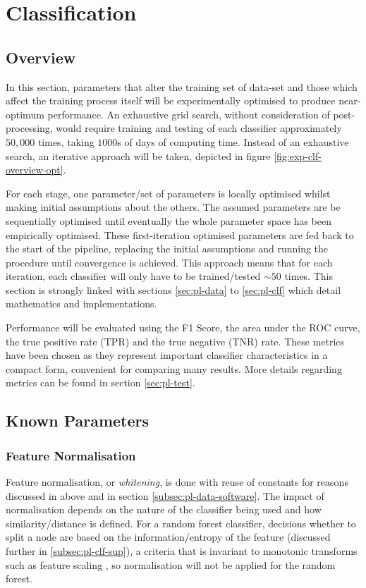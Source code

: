 \section{Classification}
\label{sec:exp-clf}
    \subsection{Overview}
    \label{subsec:exp-clf-overview}
        In this section, parameters that alter the training set of data-set and those which affect the training process itself will be experimentally optimised to produce near-optimum performance. An exhaustive grid search, without consideration of post-processing, would require training and testing of each classifier approximately $50,000$ times, taking $1000$s of days of computing time. Instead of an exhaustive search, an iterative approach will be taken, depicted in figure \ref{fig:exp-clf-overview-opt}. 
        
        
        For each stage, one parameter/set of parameters is locally optimised whilst making initial assumptions about the others. The assumed parameters are be sequentially optimised until eventually the whole parameter space has been empirically optimised. These first-iteration optimised parameters are fed back to the start of the pipeline, replacing the initial assumptions and running the procedure until convergence is achieved. This approach means that for each iteration, each classifier will only have to be trained/tested $\sim50$ times. This section is strongly linked with sections \ref{sec:pl-data} to \ref{sec:pl-clf} which detail mathematics and implementations.
        
        Performance will be evaluated using the F1 Score, the area under the ROC curve, the true positive rate (TPR) and the true negative (TNR) rate. These metrics have been chosen as they represent important classifier characteristics in a compact form, convenient for comparing many results. More details regarding metrics can be found in section \ref{sec:pl-test}.
        
    \subsection{Known Parameters}
    \label{subsec:exp-clf-known}  
        \subsubsection{Feature Normalisation}
        \label{subsubsec:exp-clf-known-featnorm}
            Feature normalisation, or \textit{whitening}, is done with reuse of constants for reasons discussed in above and in section \ref{subsec:pl-data-software}. The impact of normalisation depends on the nature of the classifier being used and how similarity/distance is defined. For a random forest classifier, decisions whether to split a node are based on the information/entropy of the feature (discussed further in \ref{subsec:pl-clf-sup}), a criteria that is invariant to monotonic transforms such as feature scaling \cite{Hastie2009}, so normalisation will not be applied for the random forest.
            
